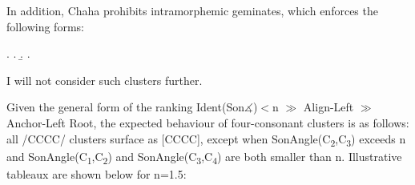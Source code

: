 \documentclass[12pt]{article}
\begin{document}
In addition, Chaha prohibits intramorphemic geminates, which enforces the following forms:

\ex. \a. 
     \b. 
     \z. \citep[(37a,b)]{rose.2000}

I will not consider such clusters further.

\bigskip

Given the general form of the ranking {\sc Ident(Son$\measuredangle$)}$<$n $\gg$ {\sc Align-Left} $\gg$ {\sc Anchor-Left Root}, the expected behaviour of four-consonant clusters is as follows: all /CCCC/ clusters surface as [CCCC], except when {\sc SonAngle}(C\textsubscript{2},C\textsubscript{3}) exceeds n and {\sc SonAngle}(C\textsubscript{1},C\textsubscript{2}) and {\sc SonAngle}(C\textsubscript{3},C\textsubscript{4}) are both smaller than n. Illustrative tableaux are shown below for n=1.5:
\end{document}

